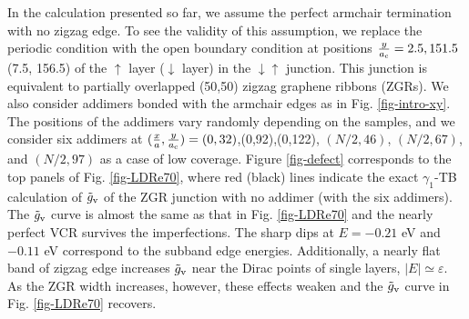 \documentclass{jpsj3}
\begin{document}
In the calculation presented so far,
we assume the perfect armchair
termination with no zigzag edge.
To see the validity of this assumption,
we replace the periodic condition with
the open boundary condition at positions $\frac{y}{a_{\rm c}}=2.5, 151.5$ 
(7.5, 156.5) of  the  $\uparrow$ layer ($\downarrow$ layer)
in the $\downarrow\uparrow$ junction. 
This junction is equivalent to partially overlapped (50,50) zigzag graphene ribbons (ZGRs).
We also consider addimers bonded with the armchair edges
as in Fig. \ref{fig-intro-xy}.
The positions of the addimers vary randomly depending
on the samples, and we consider
six addimers at $(\frac{x}{a}, \frac{y}{a_{\rm c}})=(0,32)$,(0,92),(0,122),
$(N/2,46)$, $(N/2,67)$,  and $(N/2,97)$ as a case 
of low coverage.
Figure \ref{fig-defect} corresponds to the top panels of Fig. \ref{fig-LDRe70},
where red (black) lines
indicate the exact $\gamma_1$-TB calculation
of $\tilde{g}_{\rm v}$ of the ZGR junction with no addimer
(with the six addimers).
The $\tilde{g}_{\rm v}$ curve is almost
the same as that in Fig. \ref{fig-LDRe70}
and the nearly perfect VCR survives the imperfections.
The sharp dips at $E=-0.21$ eV and $-0.11$ eV
correspond to the subband edge energies.
Additionally, a nearly flat band
of zigzag edge increases  $\tilde{g}_{\rm v}$ near
the Dirac points of single layers, $|E| \simeq \varepsilon$. 
As the ZGR width increases, however, these effects
weaken and the $\tilde{g}_{\rm v}$ curve in
 Fig. \ref{fig-LDRe70} recovers.
\end{document}
